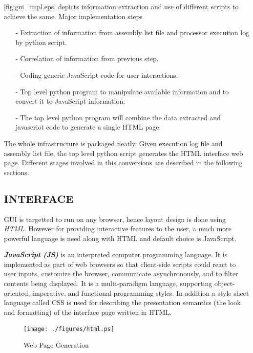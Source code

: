\figurename{\ref{fig:gui_impl.eps}} depicts information extraction and use of different scripts to achieve the same. Major implementation steps
\begin{itemize}
\item[-] Extraction of information from assembly list file and processor execution log by python script.
\item[-] Correlation of information from previous step.
\item[-] Coding generic JavaScript code for user interactions.
\item[-] Top level python program to manipulate available information and to convert it to JavaScript information. 
\item[-] The top level python program will combine the data extracted and javascriot code to generate a single HTML page. 
\end{itemize}

The whole infrastructure is packaged neatly. Given execution log file and assembly list file, the top level python script generates the HTML interface web page. Different stages involved in this conversions are described in the following sections. 

\subsection {INTERFACE}
GUI is targetted to run on any browser, hence layout design is done using {\it HTML}. However for providing interactive features to the user, a much more powerful language is need along with HTML and default choice is JavaScript.

\emph {\bf JavaScript (JS)} is an interpreted computer programming language. It is  implemented as part of web browsers so that client-side scripts could react to user inputs, customize the browser, communicate asynchronously, and to filter contents being displayed. It is a multi-paradigm language, supporting object-oriented, imperative, and functional programming styles.  
In addition a style sheet language called CSS is used for describing the presentation semantics (the look and formatting) of the interface page written in HTML.

\begin{figure}[h]
\centering
\texttt{[image: ./figures/html.ps]}
\caption{Web Page Generation}
\label{fig:impl:wpg}
\end{figure}

